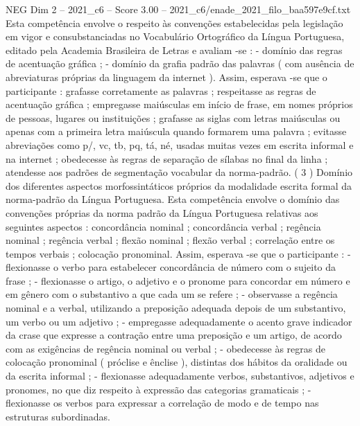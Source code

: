 \begin{textsample}{NEG Dim 2 – 2021\_c6 – Score 3.00 – 2021\_c6/enade\_2021\_filo\_baa597e9cf.txt}
Esta competência envolve o respeito às convenções estabelecidas pela legislação em vigor e consubstanciadas no Vocabulário Ortográfico da Língua Portuguesa, editado pela Academia Brasileira de Letras e avaliam -se : - domínio das regras de acentuação gráfica ; - domínio da grafia padrão das palavras ( com ausência de abreviaturas próprias da linguagem da internet ).
Assim, esperava -se que o participante : grafasse corretamente as palavras ; respeitasse as regras de acentuação gráfica ; empregasse maiúsculas em início de frase, em nomes próprios de pessoas, lugares ou instituições ; grafasse as siglas com letras maiúsculas ou apenas com a primeira letra maiúscula quando formarem uma palavra ; evitasse abreviações como p/, vc, tb, pq, tá, né, usadas muitas vezes em escrita informal e na internet ; obedecesse às regras de separação de sílabas no final da linha ; atendesse aos padrões de segmentação vocabular da norma-padrão. ( 3 ) Domínio dos diferentes aspectos morfossintáticos próprios da modalidade escrita formal da norma-padrão da Língua Portuguesa.
Esta competência envolve o domínio das convenções próprias da norma padrão da Língua Portuguesa relativas aos seguintes aspectos : concordância nominal ; concordância verbal ; regência nominal ; regência verbal ; flexão nominal ; flexão verbal ; correlação entre os tempos verbais ; colocação pronominal.
Assim, esperava -se que o participante : - flexionasse o verbo para estabelecer concordância de número com o sujeito da frase ; - flexionasse o artigo, o adjetivo e o pronome para concordar em número e em gênero com o substantivo a que cada um se refere ; - observasse a regência nominal e a verbal, utilizando a preposição adequada depois de um substantivo, um verbo ou um adjetivo ; - empregasse adequadamente o acento grave indicador da crase que expresse a contração entre uma preposição e um artigo, de acordo com as exigências de regência nominal ou verbal ; - obedecesse às regras de colocação pronominal ( próclise e ênclise ), distintas dos hábitos da oralidade ou da escrita informal ; - flexionasse adequadamente verbos, substantivos, adjetivos e pronomes, no que diz respeito à expressão das categorias gramaticais ; - flexionasse os verbos para expressar a correlação de modo e de tempo nas estruturas subordinadas.

\end{textsample}
